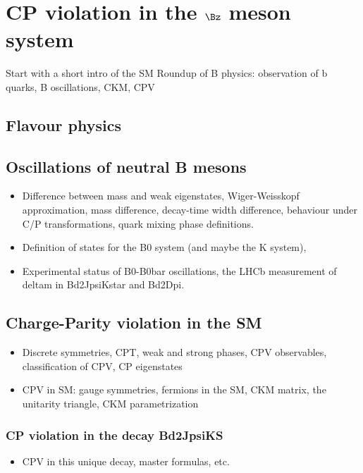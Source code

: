 
\chapter{CP violation in the $\Bz$ meson system}
\label{ch:cpv_theory}

Start with a short intro of the SM
Roundup of B physics: observation of b quarks, B oscillations, CKM, CPV



\clearpage
\section{Flavour physics}
\section{Oscillations of neutral B mesons}
\begin{itemize}
  \item Difference between mass and weak eigenstates, Wiger-Weisskopf approximation, mass difference, decay-time width difference, behaviour under C/P transformations, quark mixing phase definitions.
  \item Definition of states for the B0 system (and maybe the K system), 
  \item Experimental status of B0-B0bar oscillations, the LHCb measurement of deltam in Bd2JpsiKstar and Bd2Dpi.
\end{itemize}

\section{Charge-Parity violation in the SM}
\begin{itemize}
  \item Discrete symmetries, CPT, weak and strong phases, CPV observables, classification of CPV, CP eigenstates
  \item CPV in SM: gauge symmetries, fermions in the SM, CKM matrix, the unitarity triangle, CKM parametrization
\end{itemize}
\subsection{CP violation in the decay Bd2JpsiKS}
\begin{itemize}
  \item CPV in this unique decay, master formulas, etc.
\end{itemize}

